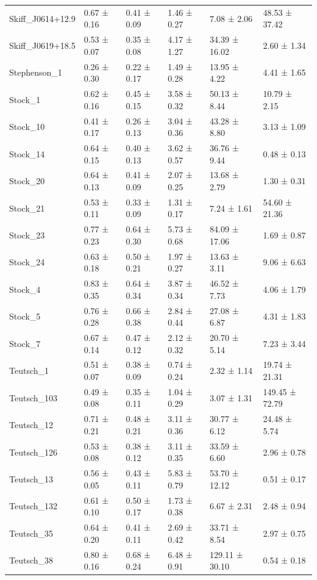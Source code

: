 \begin{tabular}{llllll}
Skiff_J0614+12.9 & 0.67 ± 0.16 & 0.41 ± 0.09 & 1.46 ± 0.27 & 7.08 ± 2.06 & 48.53 ± 37.42 \\
Skiff_J0619+18.5 & 0.53 ± 0.07 & 0.35 ± 0.08 & 4.17 ± 1.27 & 34.39 ± 16.02 & 2.60 ± 1.34 \\
Stephenson_1 & 0.26 ± 0.30 & 0.22 ± 0.17 & 1.49 ± 0.28 & 13.95 ± 4.22 & 4.41 ± 1.65 \\
Stock_1 & 0.62 ± 0.16 & 0.45 ± 0.15 & 3.58 ± 0.32 & 50.13 ± 8.44 & 10.79 ± 2.15 \\
Stock_10 & 0.41 ± 0.17 & 0.26 ± 0.13 & 3.04 ± 0.36 & 43.28 ± 8.80 & 3.13 ± 1.09 \\
Stock_14 & 0.64 ± 0.15 & 0.40 ± 0.13 & 3.62 ± 0.57 & 36.76 ± 9.44 & 0.48 ± 0.13 \\
Stock_20 & 0.64 ± 0.13 & 0.41 ± 0.09 & 2.07 ± 0.25 & 13.68 ± 2.79 & 1.30 ± 0.31 \\
Stock_21 & 0.53 ± 0.11 & 0.33 ± 0.09 & 1.31 ± 0.17 & 7.24 ± 1.61 & 54.60 ± 21.36 \\
Stock_23 & 0.77 ± 0.23 & 0.64 ± 0.30 & 5.73 ± 0.68 & 84.09 ± 17.06 & 1.69 ± 0.87 \\
Stock_24 & 0.63 ± 0.18 & 0.50 ± 0.21 & 1.97 ± 0.27 & 13.63 ± 3.11 & 9.06 ± 6.63 \\
Stock_4 & 0.83 ± 0.35 & 0.64 ± 0.34 & 3.87 ± 0.34 & 46.52 ± 7.73 & 4.06 ± 1.79 \\
Stock_5 & 0.76 ± 0.28 & 0.66 ± 0.38 & 2.84 ± 0.44 & 27.08 ± 6.87 & 4.31 ± 1.83 \\
Stock_7 & 0.67 ± 0.14 & 0.47 ± 0.12 & 2.12 ± 0.32 & 20.70 ± 5.14 & 7.23 ± 3.44 \\
Teutsch_1 & 0.51 ± 0.07 & 0.38 ± 0.09 & 0.74 ± 0.24 & 2.32 ± 1.14 & 19.74 ± 21.31 \\
Teutsch_103 & 0.49 ± 0.08 & 0.35 ± 0.11 & 1.04 ± 0.29 & 3.07 ± 1.31 & 149.45 ± 72.79 \\
Teutsch_12 & 0.71 ± 0.21 & 0.48 ± 0.21 & 3.11 ± 0.36 & 30.77 ± 6.12 & 24.48 ± 5.74 \\
Teutsch_126 & 0.53 ± 0.08 & 0.38 ± 0.12 & 3.11 ± 0.35 & 33.59 ± 6.60 & 2.96 ± 0.78 \\
Teutsch_13 & 0.56 ± 0.05 & 0.43 ± 0.11 & 5.83 ± 0.79 & 53.70 ± 12.12 & 0.51 ± 0.17 \\
Teutsch_132 & 0.61 ± 0.10 & 0.50 ± 0.17 & 1.73 ± 0.38 & 6.67 ± 2.31 & 2.48 ± 0.94 \\
Teutsch_35 & 0.64 ± 0.20 & 0.41 ± 0.11 & 2.69 ± 0.42 & 33.71 ± 8.54 & 2.97 ± 0.75 \\
Teutsch_38 & 0.80 ± 0.16 & 0.68 ± 0.24 & 6.48 ± 0.91 & 129.11 ± 30.10 & 0.54 ± 0.18 \\

\end{tabular}
